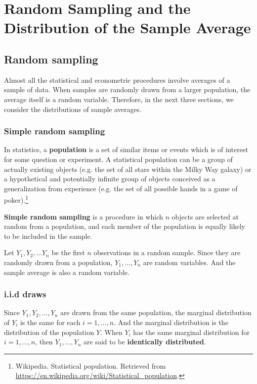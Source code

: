 \documentclass[a4paper,11pt]{article}
\begin{document}
\section{Random Sampling and the Distribution of the Sample Average}
\label{sec:orgfa81429}

\subsection{Random sampling}
\label{sec:orga52a019}

Almost all the statistical and econometric procedures involve averages
of a sample of data. When samples are randomly drawn from a larger
population, the average itself is a random variable. Therefore, in
the next three sections, we consider the distributions of sample
averages. 

\subsubsection*{Simple random sampling}
\label{sec:org427d9c8}

In statistics, a \textbf{population} is a set of similar items or events which
is of interest for some question or experiment. A statistical
population can be a group of actually existing objects (e.g. the set
of all stars within the Milky Way galaxy) or a hypothetical and
potentially infinite group of objects conceived as a generalization
from experience (e.g. the set of all possible hands in a game of
poker).\footnote{Wikipedia. Statistical population. Retrieved from
\url{https://en.wikipedia.org/wiki/Statistical\_population}.}

\textbf{Simple random sampling} is a procedure in which \(n\) objects are
selected at random from a population, and each member of the
population is equally likely to be included in the sample. 

Let \(Y_1, Y_2, \ldots Y_n\) be the first \(n\) observations in a random
sample. Since they are randomly drawn from a population, \(Y_1, \ldots,
Y_n\) are random variables. And the sample average is also a random
variable. 

\subsubsection*{i.i.d draws}
\label{sec:org0856cb7}

Since \(Y_1, Y_2, \ldots, Y_n\) are drawn from the same population, the
marginal distribution of \(Y_i\) is the same for each \(i=1, \ldots,
n\). And the marginal distribution is the distribution of the
population \(Y\). When \(Y_i\) has the same marginal distribution for
\(i=1, \ldots, n\), then \(Y_1, \ldots, Y_n\) are said to be \textbf{identically
distributed}. 
\end{document}
